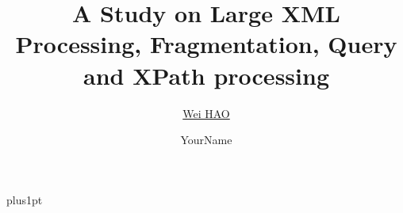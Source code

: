 \documentclass[twoside,11pt]{Latex/Classes/PhDthesisPSnPDF}
\title{A Study on Large XML Processing, Fragmentation, Query and XPath processing}
\author{\href{mailto:your@email.net}{Wei HAO}}
\author{YourName}
\begin{document}
\renewcommand\baselinestretch{1.2}
\baselineskip=18pt plus1pt



\maketitle  %

\mainmatter
\renewcommand{\chaptername}{} %





%



\end{document}
